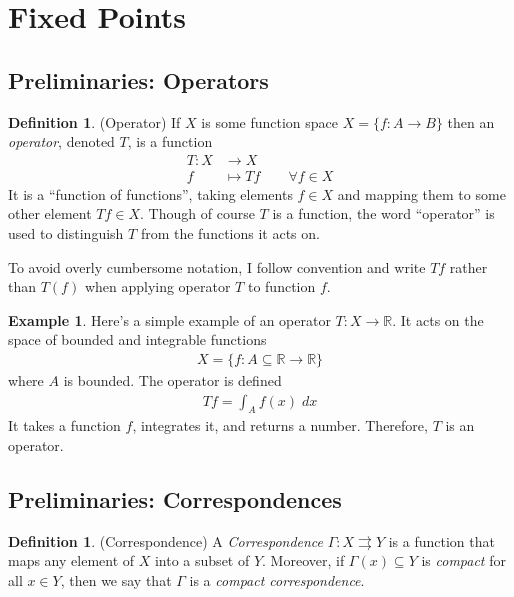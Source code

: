 \documentclass[12pt]{book}
\numberwithin{equation}{section} %
\theoremstyle{plain}
\theoremstyle{definition}
\newtheorem{defn}[thm]{Definition}
\newtheorem{ex}[thm]{Example}
\theoremstyle{remark}
\newcommand{\R}{\mathbb{R}}
\begin{document}
\clearpage
\section{Fixed Points}

\subsection{Preliminaries: Operators}

\begin{defn}{(Operator)}
If $X$ is some function space
$X = \{f:A\rightarrow B\}$
then an \emph{operator}, denoted $T$, is a function
\begin{align*}
  T:X&\rightarrow X \\
  f&\mapsto Tf
  \qquad \forall f\in X
\end{align*}
It is a ``function of functions'', taking elements $f\in X$ and mapping
them to some other element $Tf\in X$. Though of course $T$ is a
function, the word ``operator'' is used to distinguish $T$ from the
functions it acts on.

To avoid overly cumbersome notation, I follow convention and write $Tf$
rather than $T(f)$ when applying operator $T$ to function $f$.
\end{defn}

\begin{ex}
Here's a simple example of an operator $T:X\rightarrow \R$. It acts on
the space of bounded and integrable functions
\begin{align*}
  X = \{f: A\subseteq \R \rightarrow \R\}
\end{align*}
where $A$ is bounded.
The operator is defined
\begin{align*}
  Tf = \int_A f(x) \; dx
\end{align*}
It takes a function $f$, integrates it, and returns a number.
Therefore, $T$ is an operator.
\end{ex}

\subsection{Preliminaries: Correspondences}

\begin{defn}{(Correspondence)}
A \emph{Correspondence} $\Gamma:X\rightrightarrows Y$ is a function that
maps any element of $X$ into a subset of $Y$. Moreover, if
$\Gamma(x)\subseteq Y$ is \emph{compact} for all $x\in Y$, then we say
that $\Gamma$ is a \emph{compact correspondence}.
\end{defn}
\end{document}
